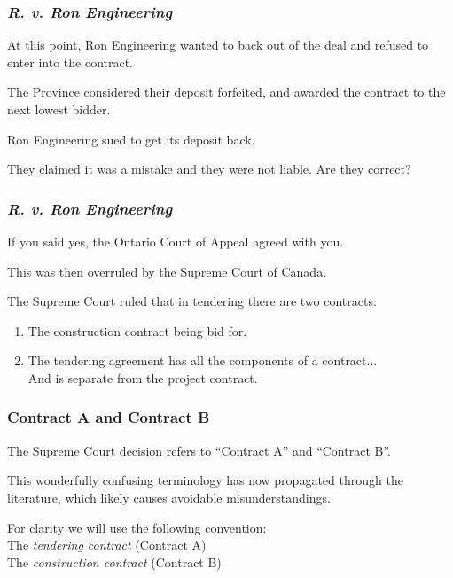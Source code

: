 \begin{frame}
\frametitle{\textit{R. v. Ron Engineering}}

At this point, Ron Engineering wanted to back out of the deal and refused to enter into the contract.

The Province considered their deposit forfeited, and awarded the contract to the next lowest bidder.

Ron Engineering sued to get its deposit back. 

They claimed it was a mistake and they were not liable. Are they correct?

\end{frame}



\begin{frame}
\frametitle{\textit{R. v. Ron Engineering}}

If you said yes, the Ontario Court of Appeal agreed with you.

This was then overruled by the Supreme Court of Canada.

The Supreme Court ruled that in tendering there are two contracts:

\begin{enumerate}
	\item The construction contract being bid for.
	\item The tendering agreement has all the components of a contract...\\
	\quad And is separate from the project contract.
\end{enumerate}

\end{frame}



\begin{frame}
\frametitle{Contract A and Contract B}

The Supreme Court decision refers to ``Contract A'' and ``Contract B''.

This wonderfully confusing terminology has now propagated through the literature, which likely causes avoidable misunderstandings.

For clarity we will use the following convention:\\
\quad The \textit{tendering contract} (Contract A)\\
\quad The \textit{construction contract} (Contract B)

\end{frame}



